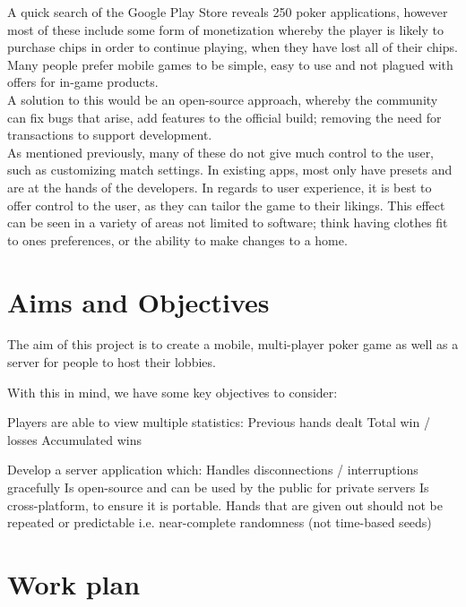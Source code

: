 \documentclass[11pt]{article}
\begin{document}
{A quick search of the Google Play Store reveals 250 poker applications, however most of these include some form of monetization whereby the player is likely to purchase chips in order to continue playing, when they have lost all of their chips. Many people prefer mobile games to be simple, easy to use and not plagued with offers for in-game products.  \\

A solution to this would be an open-source approach, whereby the community can fix bugs that arise, add features to the official build; removing the need for transactions to support development. \\ 

As mentioned previously, many of these do not give much control to the user, such as customizing match settings. In existing apps, most only have presets and are at the hands of the developers. In regards to user experience, it is best to offer control to the user, as they can tailor the game to their likings. This effect can be seen in a variety of areas not limited to software; think having clothes fit to ones preferences, or the ability to make changes to a home. %


\section*{Aims and Objectives}

The aim of this project is to create a mobile, multi-player poker game as well as a server for people to host their lobbies. 

With this in mind, we have some key objectives to consider: 

\begin{outline}


	\1 Players are able to view multiple statistics:
		\2 Previous hands dealt
		\2 Total win / losses
		\2 Accumulated wins	
	
	\1 Develop a server application which: 
		\2 Handles disconnections / interruptions gracefully
		\2 Is open-source and can be used by the public for private servers
		\2 Is cross-platform, to ensure it is portable.
	\1 Hands that are given out should not be repeated or predictable i.e. near-complete randomness (not time-based seeds)
	
	
	
\end{outline}

\newpage
\section*{Work plan}


}
\end{document}
